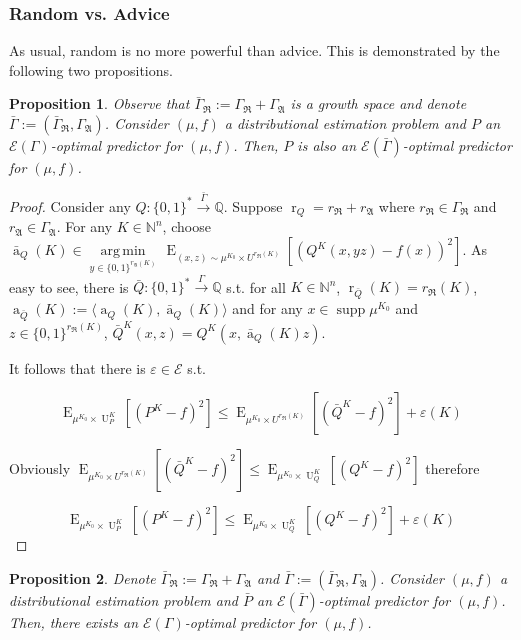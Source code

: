 \documentclass{article}
\numberwithin{equation}{section}
\theoremstyle{definition}
\theoremstyle{plain}
\newtheorem{proposition}{Proposition}[section]
\newcommand{\Bool}{\{0,1\}}
\newcommand{\Words}{{\Bool^*}}
\newcommand{\WordsLen}[1]{{\Bool^{#1}}}
\DeclareMathOperator{\Supp}{supp}
\DeclareMathOperator{\E}{E}
\DeclareMathOperator{\R}{r}
\DeclareMathOperator{\A}{a}
\DeclareMathOperator{\Un}{U}
\newcommand{\Argmin}[1]{\underset{#1}{\operatorname{arg\,min}}\,}
\newcommand{\Nats}{\mathbb{N}}
\newcommand{\Rats}{\mathbb{Q}}
\newcommand{\Chev}[1]{\langle #1 \rangle}
\newcommand{\GrowR}{\Gamma_{\mathfrak{R}}}
\newcommand{\GrowA}{\Gamma_{\mathfrak{A}}}
\newcommand{\Fall}{\mathcal{E}}
\newcommand{\EG}{\Fall(\Gamma)}
\newcommand{\Scheme}{\xrightarrow{\Gamma}}
\begin{document}
\subsubsection{Random vs. Advice}

As usual, random is no more powerful than advice. This is demonstrated by the following two propositions.

\begin{proposition}

Observe that $\bar{\Gamma}_{\mathfrak{R}}:=\GrowR+\GrowA$ is a growth space and denote $\bar{\Gamma}:=(\bar{\Gamma}_{\mathfrak{R}},\GrowA)$. Consider $(\mu,f)$ a distributional estimation problem and $P$ an $\EG$-optimal predictor for $(\mu,f)$. Then, $P$ is also an $\Fall(\bar{\Gamma})$-optimal predictor for $(\mu,f)$.

\end{proposition}

\begin{proof}

Consider any $Q: \Words \xrightarrow{\bar{\Gamma}} \Rats$. Suppose $\R_Q=r_{\mathfrak{R}}+r_{\mathfrak{A}}$ where $r_{\mathfrak{R}} \in \GrowR$ and $r_{\mathfrak{A}} \in \GrowA$. For any $K \in \Nats^n$, choose ${\bar{\A}_Q(K) \in \Argmin{y \in \WordsLen{r_{\mathfrak{A}}(K)}} \E_{(x,z) \sim \mu^{K_0} \times U^{r_{\mathfrak{R}}(K)}}[(Q^{K}(x,yz) - f(x))^2]}$. As easy to see, there is $\bar{Q}: \Words \Scheme \Rats$ s.t. for all $K \in \Nats^n$, $\R_{\bar{Q}}(K) = r_{\mathfrak{R}}(K)$, $\A_{\bar{Q}}(K):=\Chev{\A_Q(K),\bar{\A}_Q(K)}$ and for any $x \in \Supp \mu^{K_0}$ and $z \in \WordsLen{r_{\mathfrak{R}}(K)}$, ${\bar{Q}^{K}(x,z)=Q^{K}(x,\bar{\A}_Q(K)z)}$.

It follows that there is $\varepsilon \in \Fall$ s.t.

$$\E_{\mu^{K_0} \times \Un_P^{K}}[(P^{K} - f)^2] \leq \E_{\mu^{K_0} \times U^{r_{\mathfrak{R}}(K)}}[(\bar{Q}^{K} - f)^2] + \varepsilon(K)$$

Obviously $\E_{\mu^{K_0} \times U^{r_{\mathfrak{R}}(K)}}[(\bar{Q}^{K} - f)^2] \leq \E_{\mu^{K_0} \times \Un_Q^{K}}[(Q^{K} - f)^2]$ therefore

$$\E_{\mu^{K_0} \times \Un_P^{K}}[(P^{K} - f)^2] \leq \E_{\mu^{K_0} \times \Un_Q^{K}}[(Q^{K} - f)^2] + \varepsilon(K)$$
\end{proof}

\begin{proposition}

Denote $\bar{\Gamma}_{\mathfrak{R}}:=\GrowR+\GrowA$ and $\bar{\Gamma}:=(\bar{\Gamma}_{\mathfrak{R}},\GrowA)$. Consider $(\mu,f)$ a distributional estimation problem and $\bar{P}$ an $\Fall(\bar{\Gamma})$-optimal predictor for $(\mu,f)$. Then, there exists an $\EG$-optimal predictor for $(\mu,f)$.

\end{proposition}
\end{document}
